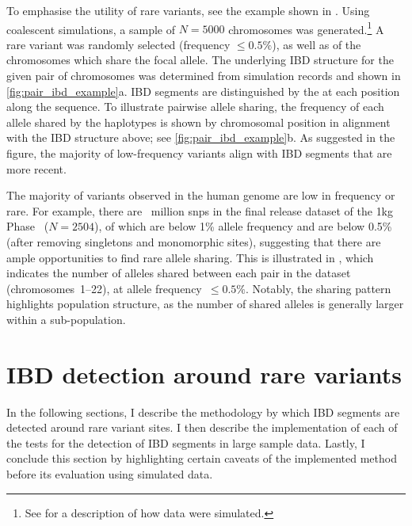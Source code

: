 To emphasise the utility of rare variants, see the example shown in .
Using coalescent simulations, a sample of ${N = \num{5000}}$ chromosomes was generated.\footnote{See  for a description of how data were simulated.}
A rare variant was randomly selected (frequency $\leq 0.5\%$), as well as  of the chromosomes which share the focal allele.
The underlying IBD structure for the given pair of chromosomes was determined from simulation records and shown in \cref{fig:pair_ibd_example}{a}.
IBD segments are distinguished by the  at each position along the sequence.
To illustrate pairwise allele sharing, the frequency of each allele shared by the  haplotypes is shown by chromosomal position in alignment with the IBD structure above; see \cref{fig:pair_ibd_example}{b}.
As suggested in the figure, the majority of low-frequency variants align with IBD segments that are more recent.

%

%

The majority of variants observed in the human genome are low in frequency or rare.
For example, there are ~million \glspl{snp} in the final release dataset of the \gls{1kg} Phase~ (${N = \num{2504}}$), of which  are below 1\% allele frequency and  are below 0.5\% (after removing singletons and monomorphic sites), suggesting that there are ample opportunities to find rare allele sharing.
This is illustrated in , which indicates the number of alleles shared between each pair in the dataset (chromosomes~1--22), at allele frequency~${\leq 0.5\%}$.
Notably, the sharing pattern highlights population structure, as the number of shared alleles is generally larger within a sub-population.



%
\section{IBD detection around rare variants}
\label{sec:tidy}
%

In the following sections, I describe the methodology by which IBD segments are detected around rare variant sites.
I then describe the implementation of each of the  tests for the detection of IBD segments in large sample data.
Lastly, I conclude this section by highlighting certain caveats of the implemented method before its evaluation using simulated data.


